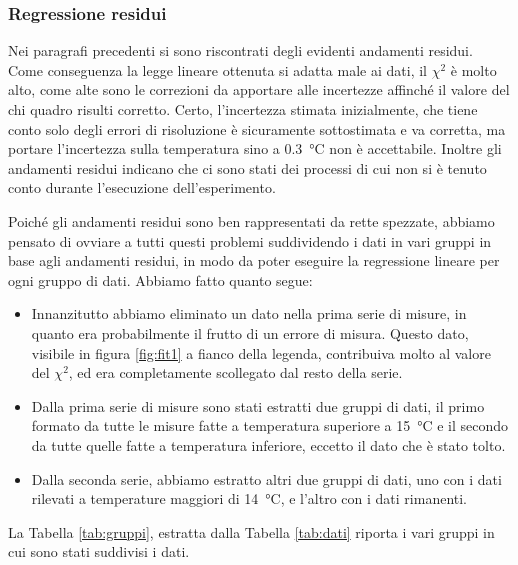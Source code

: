 \subsubsection{Regressione residui}

Nei paragrafi precedenti si sono riscontrati degli evidenti andamenti residui. Come conseguenza la legge lineare ottenuta
si adatta male ai dati, il $\chi^2$ è molto alto, come alte sono le correzioni da apportare alle incertezze affinché 
il valore del chi quadro risulti corretto. Certo, l'incertezza stimata inizialmente, che tiene conto solo degli errori di risoluzione
è sicuramente sottostimata e va corretta, ma portare l'incertezza sulla temperatura sino a \SI{0.3}{\celsius} non è accettabile.
Inoltre gli andamenti residui indicano che ci sono stati dei processi di cui non si è tenuto conto durante l'esecuzione dell'esperimento.

Poiché gli andamenti residui sono ben rappresentati da rette spezzate, abbiamo pensato di ovviare a tutti questi problemi suddividendo i
dati in vari gruppi in base agli andamenti residui, in modo da poter eseguire la regressione lineare per ogni gruppo di dati.
Abbiamo fatto quanto segue:

\label{sottoserie}
\begin{itemize}
    \item{Innanzitutto abbiamo eliminato un dato nella prima serie di misure, in quanto era probabilmente il frutto di un
        errore di misura. Questo dato, visibile in figura \ref{fig:fit1} a fianco della legenda,
        contribuiva molto al valore del $\chi^2$, ed era completamente scollegato dal resto della serie.}
    \item{Dalla prima serie di misure sono stati estratti due gruppi di dati, il primo formato da tutte le misure fatte
        a temperatura superiore a \SI{15}{\celsius} e il secondo da tutte quelle fatte a temperatura inferiore, eccetto
        il dato che è stato tolto.}
    \item{Dalla seconda serie, abbiamo estratto altri due gruppi di dati, uno con i dati rilevati a temperature maggiori di
        \SI{14}{\celsius}, e l'altro con i dati rimanenti.}
\end{itemize}

La Tabella \ref{tab:gruppi}, estratta dalla Tabella \ref{tab:dati} riporta i vari gruppi in cui sono stati suddivisi i dati.

